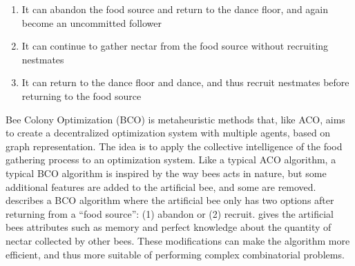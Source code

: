 \begin{enumerate}
  \item It can abandon the food source and return to the dance floor, and again become an uncommitted follower
  \item It can continue to gather nectar from the food source without recruiting nestmates
  \item It can return to the dance floor and dance, and thus recruit nestmates before returning to the food source
\end{enumerate}

Bee Colony Optimization (BCO) is metaheuristic methods that, like ACO, aims to create a decentralized optimization system with multiple agents, based on graph representation. The idea is to apply the collective intelligence of the food gathering process to an optimization system. Like a typical ACO algorithm, a typical BCO algorithm is inspired by the way bees acts in nature, but some additional features are added to the artificial bee, and some are removed. \citet{nikolic14} describes a BCO algorithm where the artificial bee only has two options after returning from a ``food source'': (1) abandon or (2) recruit. \citet{lucic03} gives the artificial bees attributes such as memory and perfect knowledge about the quantity of nectar collected by other bees. These modifications can make the algorithm more efficient, and thus more suitable of performing complex combinatorial problems.

